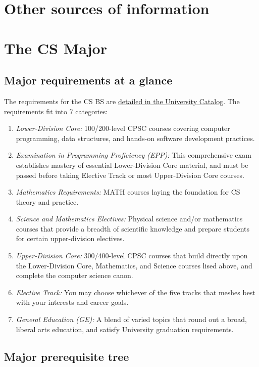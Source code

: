 \documentclass{book}
\begin{document}
\chapter{Other sources of information}

\chapter{The CS Major}

\section{Major requirements at a glance}

The requirements for the CS BS are \href{http://catalog.fullerton.edu/preview_program.php?catoid=2&poid=537&returnto=137}{detailed in the University Catalog}. The requirements fit into 7 categories:
\begin{enumerate}
\item \emph{Lower-Division Core:} 100/200-level CPSC courses covering computer programming, data structures, and hands-on software development practices.
\item \emph{Examination in Programming Proficiency (EPP):} This comprehensive exam establishes mastery of essential Lower-Division Core material, and must be passed before taking Elective Track or most Upper-Division Core courses. 
\item \emph{Mathematics Requirements:} MATH courses laying the foundation for CS theory and practice.
\item \emph{Science and Mathematics Electives:} Physical science and/or mathematics courses that provide a breadth of scientific knowledge and prepare students for certain upper-division electives.
\item \emph{Upper-Division Core:} 300/400-level CPSC courses that build directly upon the Lower-Division Core, Mathematics, and Science courses lised above, and complete the computer science canon.
\item \emph{Elective Track:} You may choose whichever of the five tracks that meshes best with your interests and career goals.
\item \emph{General Education (GE):} A blend of varied topics that round out a broad, liberal arts education, and satisfy University graduation requirements.
\end{enumerate}
  
\section{Major prerequisite tree}
\label{section:major_prerequisite_tree}
\end{document}
